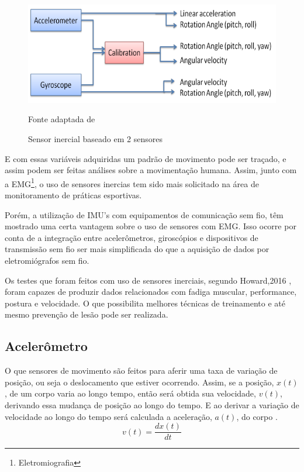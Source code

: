 		\begin{figure}[h]
			\centering
			\includegraphics[keepaspectratio=true,scale=0.3
			]{figuras/integracao_imu.png}
			\caption{Sensor inercial baseado em 2 sensores}
			Fonte adaptada de \cite{ahmad2013}
			\label{integracao_imu}
			
		\end{figure}

		E com essas variáveis adquiridas um padrão de movimento pode ser traçado, e assim podem ser feitas análises sobre a movimentação humana. Assim, junto com a EMG\footnote{Eletromiografia}, o uso de sensores inercias tem sido mais solicitado na área de monitoramento de práticas esportivas\cite{howard2016}.
		
		Porém, a utilização de IMU's com equipamentos de comunicação sem fio, têm mostrado uma certa vantagem sobre o uso de sensores com EMG. Isso ocorre por conta de a integração entre acelerômetros, giroscópios e dispositivos de transmissão sem fio ser mais simplificada do que a aquisição de dados por eletromiógrafos sem fio\cite{howard2016}. 
		
		Os testes que foram feitos com uso de sensores inerciais, segundo  Howard,2016 , foram capazes de produzir dados relacionados com fadiga muscular, performance, postura e velocidade. O que possibilita melhores técnicas de treinamento e até mesmo prevenção de lesão pode ser realizada.

			\subsection{Acelerômetro}
			
				O que sensores de movimento são feitos para aferir uma taxa de variação de posição, ou seja o deslocamento que estiver ocorrendo. Assim, se a posição, $x(t)$, de um corpo varia ao longo tempo, então será obtida sua velocidade, $v(t)$,  derivando essa mudança de posição ao longo do tempo. E ao derivar a variação de velocidade ao longo do tempo será calculada a aceleração, $a(t)$, do corpo \cite{moyses2013}.
				\begin{equation}
				v(t) = \frac{dx(t)}{dt}
				\end{equation}
				

